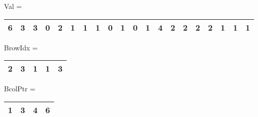Val = 
\begin{tabular}{|l|l|l|l|l|l|l|l|l|l|l|l|l|l|l|l|l|l|l|l|}
\hline
6&3&3&0&2&1&1&1&0&1&0&1&4&2&2&2&2&1&1&1\\\hline
\end{tabular}

BrowIdx = 
\begin{tabular}{|l|l|l|l|l|}
\hline
2&3&1&1&3\\\hline
\end{tabular}

BcolPtr = 
\begin{tabular}{|l|l|l|l|}
\hline
1&3&4&6\\\hline
\end{tabular}


